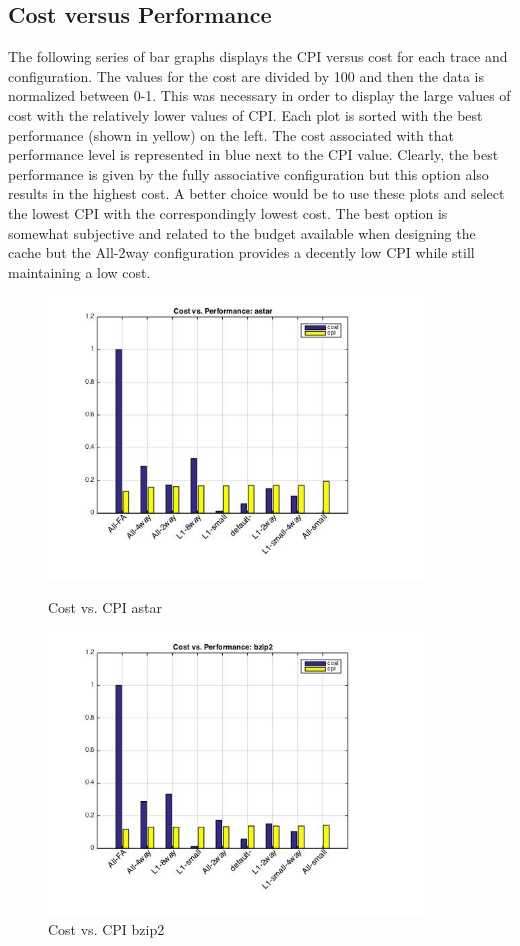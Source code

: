 \documentclass[11pt,titlepage]{article}
\begin{document}
\subsection{Cost versus Performance} \label{sec:costVperf} The following series of bar graphs displays the CPI versus cost for each trace and configuration. The values for the cost are divided by 100 and then the data is normalized between 0-1. This was necessary in order to display the large values of cost with the relatively lower values of CPI. Each plot is sorted with the best performance (shown in yellow) on the left. The cost associated with that performance level is represented in blue next to the CPI value. Clearly, the best performance is given by the fully associative configuration but this option also results in the highest cost. A better choice would be to use these plots and select the lowest CPI with the correspondingly lowest cost. The best option is somewhat subjective and related to the budget available when designing the cache but the All-2way configuration provides a decently low CPI while still maintaining a low cost.
\begin{figure}[H]
  \centering
  \begin{minipage}{.5\textwidth}
    \centering
    \includegraphics[width=10cm]{cvpastar}
    \caption{Cost vs. CPI astar}
    \label{fig:cvpastar}
  \end{minipage}%
  \begin{minipage}{.5\textwidth}
    \centering
    \includegraphics[width=10cm]{cvpbzip2}
    \caption{Cost vs. CPI bzip2}
    \label{fig:cvpbzip2}
  \end{minipage}
\end{figure}
\end{document}
